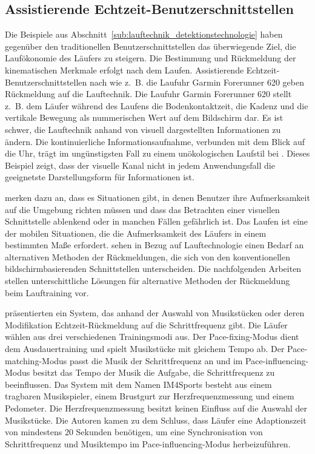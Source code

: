 \subsection{Assistierende Echtzeit-Benutzerschnittstellen} 

\label{sub:assistierende_echtzeit_benutzerschnittstellen}

Die Beispiele aus Abschnitt~\ref{sub:lauftechnik_detektionstechnologie} haben gegenüber den traditionellen Benutzerschnittstellen das überwiegende Ziel, die Laufökonomie des Läufers zu steigern. Die Bestimmung und Rückmeldung der kinematischen Merkmale erfolgt nach dem Laufen. Assistierende Echtzeit-Benutzerschnittstellen nach \citet{Jensen2014} wie z.~B. die Laufuhr Garmin Forerunner 620 geben Rückmeldung auf die Lauftechnik. Die Laufuhr Garmin Forerunner 620 stellt z.~B. dem Läufer während des Laufens die Bodenkontaktzeit, die Kadenz und die vertikale Bewegung als nummerischen Wert auf dem Bildschirm dar. Es ist schwer, die Lauftechnik anhand von visuell dargestellten Informationen zu ändern. Die kontinuierliche Informationsaufnahme, verbunden mit dem Blick auf die Uhr, trägt im ungünstigsten Fall zu einem unökologischen Laufstil bei \citep[][]{Jensen2014}. Dieses Beispiel zeigt, dass der visuelle Kanal nicht in jedem Anwendungsfall die geeignetste Darstellungsform für Informationen ist. 

\citet[][]{Zhao2007} merken dazu an, dass es Situationen gibt, in denen Benutzer ihre Aufmerksamkeit auf die Umgebung richten müssen und dass das Betrachten einer visuellen Schnittstelle ablenkend oder in manchen Fällen gefährlich ist. Das Laufen ist eine der mobilen Situationen, die die Aufmerksamkeit des Läufers in einem bestimmten Maße erfordert. \citet[][]{Jensen2014} sehen in Bezug auf Lauftechnologie einen Bedarf an alternativen Methoden der Rückmeldungen, die sich von den konventionellen bildschirmbasierenden Schnittstellen unterscheiden. Die nachfolgenden Arbeiten stellen unterschittliche Lösungen für alternative Methoden der Rückmeldung beim Lauftraining vor. 

\citet[][]{Wijnalda2005} präsentierten ein System, das anhand der Auswahl von Musikstücken oder deren Modifikation Echtzeit-Rückmeldung auf die Schrittfrequenz gibt. Die Läufer wählen aus drei verschiedenen Trainingsmodi aus. Der Pace-fixing-Modus dient dem Ausdauertraining und spielt Musikstücke mit gleichem Tempo ab. Der Pace-matching-Modus passt die Musik der Schrittfrequenz an und im Pace-influencing-Modus besitzt das Tempo der Musik die Aufgabe, die Schrittfrequenz zu beeinflussen. Das System mit dem Namen IM4Sports besteht aus einem tragbaren Musikspieler, einem Brustgurt zur Herzfrequenzmessung und einem Pedometer. Die Herzfrequenzmessung besitzt keinen Einfluss auf die Auswahl der Musikstücke. Die Autoren kamen zu dem Schluss, dass Läufer eine Adaptionszeit von mindestens 20 Sekunden benötigen, um eine Synchronisation von Schrittfrequenz und Musiktempo im Pace-influencing-Modus herbeizuführen.

